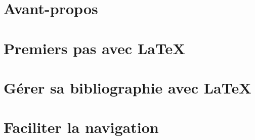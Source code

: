\ifpapierstandard
\maketitle
\fi

\def\epi{Du \LaTeX sed \TeX}
\def\episource{Proverbe Latin}

\part*{Avant-propos}

\newpage



\mainmatter

\def\epi{Les Sabins \textelp{} commencerent la bataille, qui fut aspre \& dura longuement}
\def\episource{\cite{Sabins}}

\part{Premiers pas avec \LaTeX}








\def\epi{Empoisonnée de dogmes et de mythes, notre opinion, même la moins ennemie des lumières, a perdu jusqu’au goût du contrôle. Le jour où, ayant pris soin d’abord de ne pas la rebuter par un oiseux pédantisme , nous aurons réussi à la persuader de mesurer la valeur d’une connaissance sur son empressement à tendre le cou d’avance à la réfutation, les forces de la raison remporteront une de leurs plus éclatantes victoires. C’est à la préparer que travaillent nos humbles notes, nos petites références tatillonnes que moquent aujourd’hui, sans les comprendre, tant de beaux esprits.}
\def\episource{\cite{Bloch}}
\part{Gérer sa bibliographie avec \LaTeX}\label{bibliographie}








\def\epi{Quand on ne sait pas où on va, il faut y aller\ldots et le plus vite possible !}
\def\episource{Devise shadok}
\part{Faciliter la navigation}




